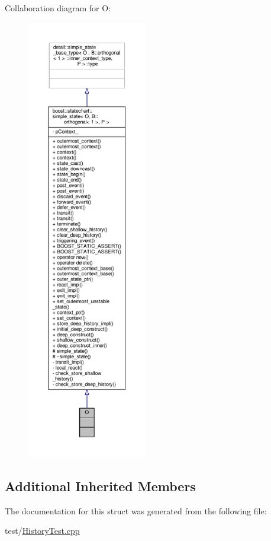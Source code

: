 Collaboration diagram for O\+:
\nopagebreak
\begin{figure}[H]
\begin{center}
\leavevmode
\includegraphics[height=550pt]{struct_o__coll__graph}
\end{center}
\end{figure}
\subsection*{Additional Inherited Members}


The documentation for this struct was generated from the following file\+:\begin{DoxyCompactItemize}
\item 
test/\mbox{\hyperlink{_history_test_8cpp}{History\+Test.\+cpp}}\end{DoxyCompactItemize}
